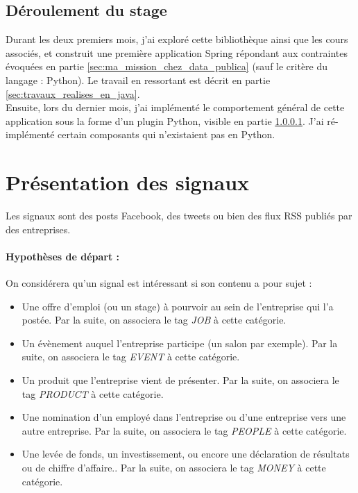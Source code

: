     \subsection{Déroulement du stage}
        Durant les deux premiers mois, j'ai exploré cette bibliothèque ainsi que les cours associés, et construit une première application Spring répondant aux contraintes évoquées en partie \ref{sec:ma_mission_chez_data_publica} (sauf le critère du langage : Python). Le travail en ressortant est décrit en partie \ref{sec:travaux_realises_en_java}.\\

        Ensuite, lors du dernier mois, j’ai implémenté le comportement général de cette application sous la forme d’un plugin Python, visible en partie \ref{}. J'ai ré-implémenté certain composants qui n'existaient pas en Python.

\section{Présentation des signaux}
    Les signaux sont des posts Facebook, des tweets ou bien des flux RSS publiés par des entreprises.

    \paragraph{Hypothèses de départ :}
        On considérera qu'un signal est intéressant si son contenu a pour sujet :
        \begin{itemize}
            \item Une offre d'emploi (ou un stage) à pourvoir au sein de l'entreprise qui l'a postée. Par la suite, on associera le tag \textit{JOB} à cette catégorie.
            \item Un évènement auquel l'entreprise participe (un salon par exemple). Par la suite, on associera le tag \textit{EVENT} à cette catégorie.
            \item Un produit que l'entreprise vient de présenter. Par la suite, on associera le tag \textit{PRODUCT} à cette catégorie.
            \item Une nomination d'un employé dans l'entreprise ou d'une entreprise vers une autre entreprise. Par la suite, on associera le tag \textit{PEOPLE} à cette catégorie.
            \item Une levée de fonds, un investissement, ou encore une déclaration de résultats ou de chiffre d'affaire.. Par la suite, on associera le tag \textit{MONEY} à cette catégorie.
        \end{itemize}

